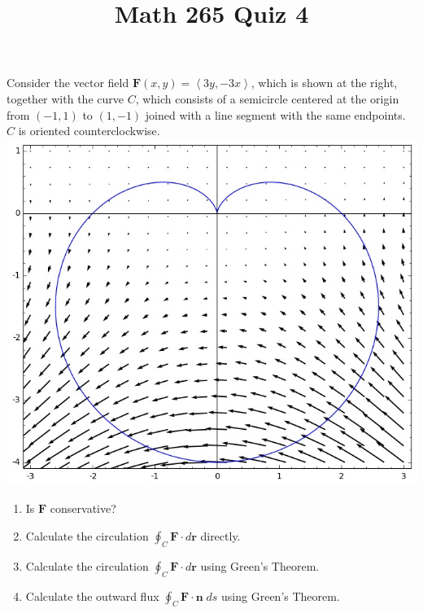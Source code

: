 \documentclass[12pt]{article}
\title{Math 265 Quiz 4}\author{}\date{}
\begin{document}
\maketitle
\thispagestyle{empty}
\begin{multicols}{2}
Consider the vector field $\mathbold{F}\left(x,y\right)
=\left\langle 3y,-3x\right\rangle$, which is shown
at the right, together with the curve $C$,
which consists of a semicircle centered at the origin
from $\left(-1,1\right)$ to $\left(1,-1\right)$
joined with a line segment with the same endpoints.
$C$ is oriented counterclockwise.
\includegraphics[scale=.6]{Cardioid}
\end{multicols}
\begin{enumerate}
\item Is $\mathbold{F}$ conservative?
\vspace{1in}
\item Calculate the circulation $\oint_C\mathbold{F}
\cdot d\mathbold{r}$ directly.
\vspace{2in}
\item Calculate the circulation $\oint_C\mathbold{F}
\cdot d\mathbold{r}$ using Green's Theorem.
\vspace{4in}
\item Calculate the outward flux $\oint_C\mathbold{F}
\cdot\mathbold{n}\;ds$ using Green's Theorem.
\end{enumerate}
\end{document}
